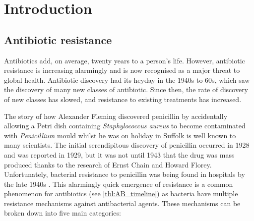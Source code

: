\section{Introduction}

\subsection{Antibiotic resistance}

Antibiotics add, on average, twenty years to a person's life\cite{davies2013drugs}. However, antibiotic resistance is increasing alarmingly and is now recognised as a major threat to global health\cite{ResistanceUS,davies2013drugs}. Antibiotic discovery had its heyday in the 1940s to 60s, which saw the discovery of many new classes of antibiotic. Since then, the rate of discovery of new classes has slowed, and resistance to existing treatments has increased.

The story of how Alexander Fleming discovered penicillin by accidentally allowing a Petri dish containing \textit{Staphylococcus aureus} to become contaminated with \textit{Penicillium} mould whilst he was on holiday in Suffolk \cite{davies2013drugs} is well known to many scientists. The initial serendipitous discovery of penicillin occurred in 1928 and was reported in 1929\cite{Fleming1929}, but it was not until 1943 that the drug was mass produced thanks to the research of Ernst Chain and Howard Florey. Unfortunately, bacterial resistance to penicillin was being found in hospitals by the late 1940s \cite{Barber1947, Rountree1949}. This alarmingly quick emergence of resistance is a common phenomenon for antibiotics (see \ref{tbl:AB_timeline}) as bacteria have multiple resistance mechanisms against antibacterial agents. These mechanisms can be broken down into five main categories\cite{ANIE:ANIE201209979,davies2013drugs}:

